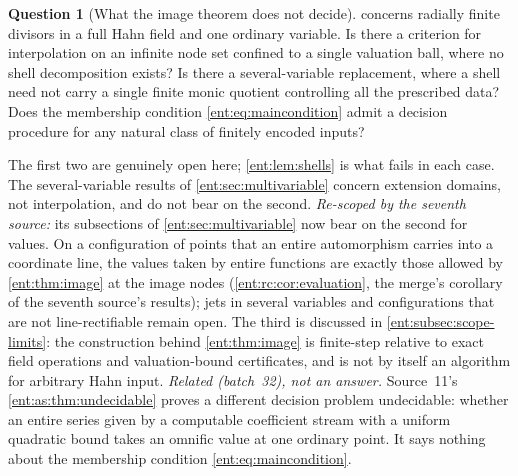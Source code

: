 \documentclass[11pt]{article}
\theoremstyle{plain}
\theoremstyle{plain}
\theoremstyle{plain}
\theoremstyle{definition}
\theoremstyle{definition}
\theoremstyle{definition}
\theoremstyle{definition}
\newtheorem{question}[question]{Question}
\theoremstyle{remark}
\begin{document}
\begin{question}[What the image theorem does not decide]
\label{ent:q:image-remaining}
 concerns radially finite divisors in a full Hahn field
and one ordinary variable. Is there a criterion for interpolation on an
infinite node set confined to a single valuation ball, where no shell
decomposition exists? Is there a several-variable replacement, where a shell
need not carry a single finite monic quotient controlling all the prescribed
data? Does the membership condition \eqref{ent:eq:maincondition} admit a
decision procedure for any natural class of finitely encoded inputs?
\end{question}
The first two are genuinely open here; \cref{ent:lem:shells} is what fails in
each case. The several-variable results of \cref{ent:sec:multivariable}
concern extension domains, not interpolation, and do not bear on the second.
\emph{Re-scoped by the seventh source:} its subsections of
\cref{ent:sec:multivariable} now bear on the second for values. On a
configuration of points that an entire automorphism carries into a coordinate
line, the values taken by entire functions are exactly those allowed by
\cref{ent:thm:image} at the image nodes (\cref{ent:rc:cor:evaluation}, the
merge's corollary of the seventh source's results); jets in several
variables and configurations that are not line-rectifiable remain open.
The third is discussed in \cref{ent:subsec:scope-limits}: the
construction behind \cref{ent:thm:image} is finite-step relative to exact
field operations and valuation-bound certificates, and is not by itself an
algorithm for arbitrary Hahn input.
\emph{Related (batch~32), not an answer.} Source~11's
\cref{ent:as:thm:undecidable} proves a different decision problem undecidable:
whether an entire series given by a computable coefficient stream with a
uniform quadratic bound takes an omnific value at one ordinary point. It says
nothing about the membership condition \eqref{ent:eq:maincondition}.
\end{document}
